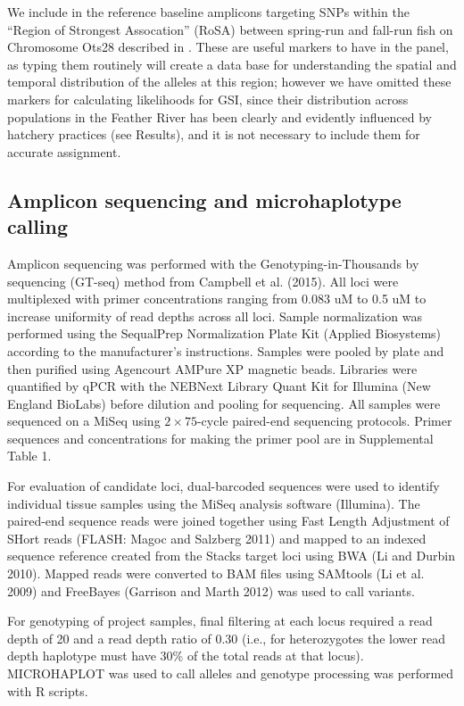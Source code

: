 We include in the reference baseline amplicons targeting SNPs within the ``Region of Strongest Assocation'' (RoSA)
between spring-run and fall-run fish on Chromosome Ots28 described in \citet{thompson2020complex}.  These are useful markers to
have in the panel, as typing them routinely will create a data base for understanding the spatial and temporal
distribution of the alleles at this region; however we have omitted these markers for calculating likelihoods for
GSI, since their distribution across populations in the Feather River has been clearly and evidently
influenced by hatchery practices (see Results), and it is not necessary to include them for accurate assignment.

\subsection*{Amplicon sequencing and microhaplotype calling}

Amplicon sequencing was performed with the Genotyping-in-Thousands by sequencing (GT-seq) method from Campbell et al. (2015). All loci were 
multiplexed with primer concentrations ranging from 0.083 uM to 0.5 uM to increase uniformity of read depths across all loci. Sample normalization was 
performed using the SequalPrep Normalization Plate Kit (Applied Biosystems) according to the manufacturer's instructions. Samples were pooled by plate 
and then purified using Agencourt AMPure XP magnetic beads. Libraries were quantified by qPCR with the NEBNext Library Quant Kit for Illumina (New 
England BioLabs) before dilution and pooling for sequencing. All samples were sequenced on a MiSeq using $2\times 75$-cycle paired-end sequencing protocols. 
Primer sequences and concentrations for making the primer pool are in Supplemental Table 1. 

For evaluation of candidate loci, dual-barcoded sequences were used to identify individual tissue samples using the MiSeq analysis software (Illumina). The paired-end sequence reads were joined together using Fast Length Adjustment of SHort reads (FLASH: Magoc and Salzberg 2011) and mapped to an indexed sequence reference created from the Stacks target loci using BWA (Li and Durbin 2010). Mapped reads were converted to BAM files using SAMtools (Li et al. 2009) and FreeBayes (Garrison and Marth 2012) was used to call variants.

For genotyping of project samples, final filtering at each locus required a read depth of 20 and a read depth ratio of 0.30 (i.e., for heterozygotes the lower read depth haplotype must have 30\% of the total reads at that locus). MICROHAPLOT was used to call alleles and genotype processing was performed with R scripts. 

